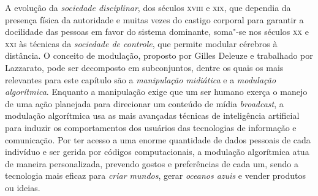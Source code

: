 A evolução da \textit{sociedade disciplinar}, dos séculos \textsc{xviii} e \textsc{xix}, que
dependia da presença física da autoridade e muitas vezes do castigo
corporal para garantir a docilidade das pessoas em favor do sistema
dominante, soma"-se nos séculos \textsc{xx} e \textsc{xxi} às técnicas da \textit{sociedade
de controle}, que permite modular cérebros à distância. O conceito de
modulação, proposto por Gilles Deleuze e trabalhado por Lazzarato, pode
ser decomposto em subconjuntos, dentre os quais os mais relevantes para
este capítulo são a \textit{manipulação midiática} e a \textit{modulação
algorítmica}. Enquanto a manipulação exige que um ser humano exerça o
manejo de uma ação planejada para direcionar um conteúdo de mídia
\textit{broadcast}, a modulação algorítmica usa as mais avançadas técnicas
de inteligência artificial para induzir os comportamentos dos usuários
das tecnologias de informação e comunicação. Por ter acesso a uma enorme
quantidade de dados pessoais de cada indivíduo e ser gerida por códigos
computacionais, a modulação algorítmica atua de maneira personalizada,
prevendo gostos e preferências de cada um, sendo a tecnologia mais
eficaz para \textit{criar mundos}, gerar \textit{oceanos azuis} e vender
produtos ou ideias.


